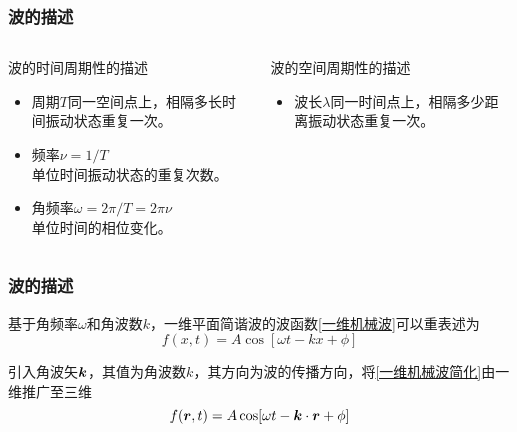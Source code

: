 \begin{frame}
    \frametitle{波的描述}
    \begin{columns}[t] 
        \begin{column}{6cm} 
            波的时间周期性的描述
            \begin{itemize}
                \item 周期$T$\quad 同一空间点上，相隔多长时间振动状态重复一次。
                \item 频率$\nu=1/T$\\单位时间振动状态的重复次数。
                \item 角频率$\omega=2\pi/T=2\pi\nu$\\单位时间的相位变化。
            \end{itemize}
        \end{column}
        \begin{column}{6cm} 
            波的空间周期性的描述
            \begin{itemize}
                \item 波长$\lambda$\quad 同一时间点上，相隔多少距离振动状态重复一次。
                \only<-1>{\item ？\\\vphantom{？}}
            \end{itemize}
        \end{column}
    \end{columns}\vspace{3ex}

\end{frame}

\begin{frame}
    \frametitle{波的描述}
    基于角频率$\omega$和角波数$k$，一维平面简谐波的波函数\eqref{一维机械波}可以重表述为
    \begin{equation}
        f(x,t)=A\cos[\omega t-kx+\phi]\label{一维机械波简化}
    \end{equation}

    引入角波矢$\vb*{k}$，其值为角波数$k$，其方向为波的传播方向，将\eqref{一维机械波简化}由一维推广至三维
    \begin{equation}
        f(\vb*{r},t)=A\cos[\omega t-\vb*{k}\cdot\vb*{r}+\phi]\label{三维机械波简化}
    \end{equation}
\end{frame}

